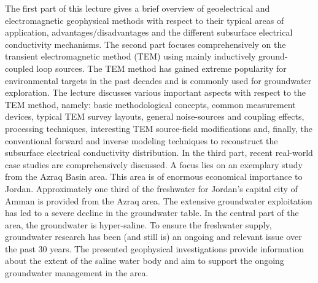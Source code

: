 The first part of this lecture gives a brief overview of geoelectrical and electromagnetic geophysical methods with respect to their typical areas of application, advantages/disadvantages and the different subsurface electrical conductivity mechanisms. The second part focuses comprehensively on the transient electromagnetic method (TEM) using mainly inductively ground-coupled loop sources. The TEM method has gained extreme popularity for environmental targets in the past decades and is commonly used for groundwater exploration. The lecture discusses various important aspects with respect to the TEM method, namely: basic methodological concepts, common measurement devices, typical TEM survey layouts, general noise-sources and coupling effects, processing techniques, interesting TEM source-field modifications and, finally, the conventional forward and inverse modeling techniques to reconstruct the subsurface electrical conductivity distribution. In the third part, recent real-world case studies are comprehensively discussed. A focus lies on an exemplary study from the Azraq Basin area. This area is of enormous economical importance to Jordan. Approximately one third of the freshwater for Jordan’s capital city of Amman is provided from the Azraq area. The extensive groundwater exploitation has led to a severe decline in the groundwater table. In the central part of the area, the groundwater is hyper-saline. To ensure the freshwater supply, groundwater research has been (and still is) an ongoing and relevant issue over the past 30 years. The presented geophysical investigations provide information about the extent of the saline water body and aim to support the ongoing groundwater management in the area.
